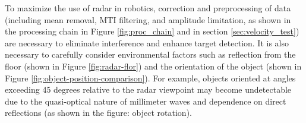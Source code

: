 To maximize the use of radar in robotics, correction and preprocessing of data (including mean removal, MTI filtering, and amplitude limitation, as shown in the processing chain in Figure \ref{fig:proc_chain} and in section \ref{sec:velocity_test}) are necessary to eliminate interference and enhance target detection. It is also necessary to carefully consider environmental factors such as reflection from the floor (shown in Figure \ref{fig:radar-flor}) and the orientation of the object (shown in Figure \ref{fig:object-position-comparison}). For example, objects oriented at angles exceeding 45 degrees relative to the radar viewpoint may become undetectable due to the quasi-optical nature of millimeter waves and dependence on direct reflections (as shown in the figure: object rotation).